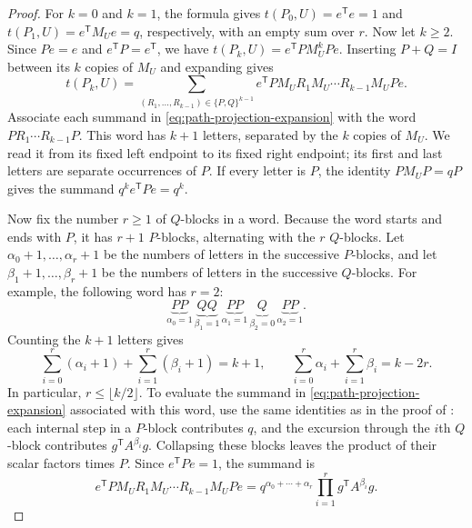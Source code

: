 \documentclass[11pt]{article}
\theoremstyle{remark}
\numberwithin{equation}{section}
\newcommand{\tP}[2]{t(P_{#1},#2)}
\begin{document}
\begin{proof}
  For $k=0$ and $k=1$, the formula gives $\tP0U=e^{\mathsf T}e=1$ and
  $\tP1U=e^{\mathsf T}M_Ue=q$, respectively, with an empty sum over $r$.
  Now let $k\ge2$. Since $Pe=e$ and $e^{\mathsf T}P=e^{\mathsf T}$,
  we have $\tP kU = e^{\mathsf T}PM_U^kPe$.
  Inserting $P+Q=I$ between its $k$ copies of $M_U$ and expanding gives
  \begin{equation}\label{eq:path-projection-expansion}
    \tP kU=
    \sum_{(R_1,\ldots,R_{k-1})\in\{P,Q\}^{k-1}}
      e^{\mathsf T}P M_U R_1M_U\cdots R_{k-1}M_UPe.
  \end{equation}
  Associate each summand in \eqref{eq:path-projection-expansion} with
  the word $PR_1\cdots R_{k-1}P$.
  This word has $k+1$ letters, separated by the $k$ copies of $M_U$.
  We read it from its fixed left endpoint to its fixed right endpoint;
  its first and last letters are separate occurrences of $P$.
  If every letter is $P$, the identity $P M_U P=qP$ gives the summand
  $q^k e^{\mathsf T}Pe=q^k$.

  Now fix the number $r\ge1$ of $Q$-blocks in a word.
  Because the word starts and ends with $P$, it has $r+1$ $P$-blocks,
  alternating with the $r$ $Q$-blocks. Let
  $\alpha_0+1,\ldots,\alpha_r+1$ be the numbers of letters in the
  successive $P$-blocks, and let $\beta_1+1,\ldots,\beta_r+1$ be the
  numbers of letters in the successive $Q$-blocks.  For example, the
  following word has $r=2$:
  \[
    \underbrace{PP}_{\alpha_0=1}\,
    \underbrace{QQ}_{\beta_1=1}\,
    \underbrace{PP}_{\alpha_1=1}\,
    \underbrace{Q}_{\beta_2=0}\,
    \underbrace{PP}_{\alpha_2=1}.
  \]
  Counting the $k+1$ letters gives
  \[
    \sum_{i=0}^r(\alpha_i+1)+\sum_{i=1}^r(\beta_i+1)=k+1,
    \qquad
    \sum_{i=0}^r\alpha_i+\sum_{i=1}^r\beta_i=k-2r.
  \]
  In particular, $r\le\lfloor k/2\rfloor$.
  To evaluate the summand in \eqref{eq:path-projection-expansion}
  associated with this word, use the same identities as in the proof
  of : each internal step in a $P$-block
  contributes $q$, and the excursion through the $i$th $Q$-block
  contributes $g^{\mathsf T}A^{\beta_i}g$.
  Collapsing these blocks leaves the product of their scalar factors
  times $P$. Since $e^{\mathsf T}Pe=1$, the summand is
  \[
    e^{\mathsf T}P M_U R_1M_U\cdots R_{k-1}M_UPe
    =q^{\alpha_0+\cdots+\alpha_r}
      \prod_{i=1}^rg^{\mathsf T}A^{\beta_i}g.
  \]


\end{proof}
\end{document}
